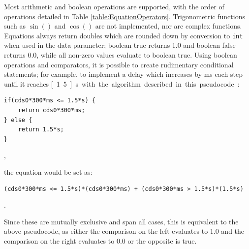\documentclass[PaulGanssle-Thesis.tex]{subfiles}
\begin{document}
Most arithmetic and boolean operations are supported, with the order of operations detailed in Table \ref{table:EquationOperators}. Trigonometric functions such as $\sin()$ and $\cos()$ are not implemented, nor are complex functions. Equations always return doubles which are rounded down by conversion to \lstinline|int| when used in the data parameter; boolean true returns 1.0 and boolean false returns 0.0, while all non-zero values evaluate to boolean true. Using boolean operations and comparators, it is possible to create rudimentary conditional statements; for example, to implement a delay which increases by \unit[300]{ms} each step until it reaches \unit[1.5]{s} with the algorithm described in this pseudocode:

\begin{lstlisting}
if(cds0*300*ms <= 1.5*s) {
	return cds0*300*ms;
} else {
	return 1.5*s;
}
\end{lstlisting},

the equation would be set as:

\begin{lstlisting}
(cds0*300*ms <= 1.5*s)*(cds0*300*ms) + (cds0*300*ms > 1.5*s)*(1.5*s)
\end{lstlisting}.

Since these are mutually exclusive and span all cases, this is equivalent to the above pseudocode, as either the comparison on the left evaluates to 1.0 and the comparison on the right evaluates to 0.0 or the opposite is true.
\end{document}
